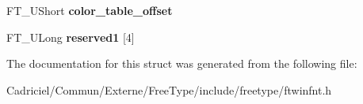 \begin{DoxyCompactItemize}
\item 
\hypertarget{struct_f_t___win_f_n_t___header_rec___a83fa51bfd7fe814f8264416204701c60}{F\-T\-\_\-\-U\-Short {\bfseries color\-\_\-table\-\_\-offset}}\label{struct_f_t___win_f_n_t___header_rec___a83fa51bfd7fe814f8264416204701c60}

\item 
\hypertarget{struct_f_t___win_f_n_t___header_rec___af01de9742608fb7a2a603d062f3783e3}{F\-T\-\_\-\-U\-Long {\bfseries reserved1} \mbox{[}4\mbox{]}}\label{struct_f_t___win_f_n_t___header_rec___af01de9742608fb7a2a603d062f3783e3}

\end{DoxyCompactItemize}


The documentation for this struct was generated from the following file\-:\begin{DoxyCompactItemize}
\item 
Cadriciel/\-Commun/\-Externe/\-Free\-Type/include/freetype/ftwinfnt.\-h\end{DoxyCompactItemize}
